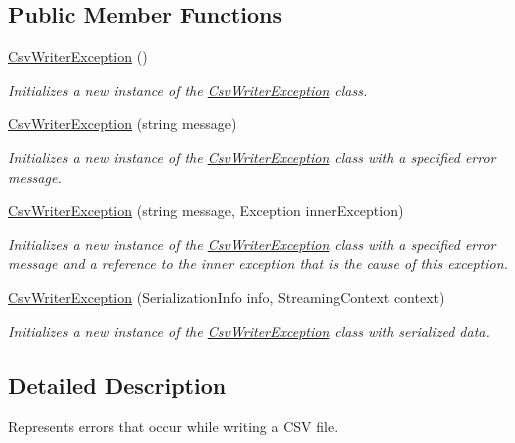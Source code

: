 \subsection*{Public Member Functions}
\begin{DoxyCompactItemize}
\item 
\hyperlink{a00062_a4e5030012e1258c3db3da1725c0d9332}{Csv\-Writer\-Exception} ()
\begin{DoxyCompactList}\small\item\em Initializes a new instance of the \hyperlink{a00062}{Csv\-Writer\-Exception} class. \end{DoxyCompactList}\item 
\hyperlink{a00062_a6d01cb3854a95d77cd1f9e2d8b1aa304}{Csv\-Writer\-Exception} (string message)
\begin{DoxyCompactList}\small\item\em Initializes a new instance of the \hyperlink{a00062}{Csv\-Writer\-Exception} class with a specified error message. \end{DoxyCompactList}\item 
\hyperlink{a00062_aedacd3e9a9161a62991cc1d388298a14}{Csv\-Writer\-Exception} (string message, Exception inner\-Exception)
\begin{DoxyCompactList}\small\item\em Initializes a new instance of the \hyperlink{a00062}{Csv\-Writer\-Exception} class with a specified error message and a reference to the inner exception that is the cause of this exception. \end{DoxyCompactList}\item 
\hyperlink{a00062_ac4ae90ce8433632c2047d4de364effa6}{Csv\-Writer\-Exception} (Serialization\-Info info, Streaming\-Context context)
\begin{DoxyCompactList}\small\item\em Initializes a new instance of the \hyperlink{a00062}{Csv\-Writer\-Exception} class with serialized data. \end{DoxyCompactList}\end{DoxyCompactItemize}


\subsection{Detailed Description}
Represents errors that occur while writing a C\-S\-V file. 



